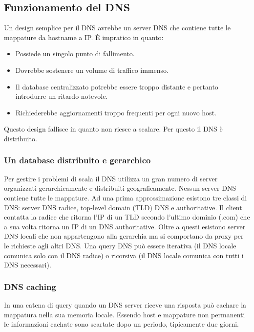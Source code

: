 \subsection{Funzionamento del DNS}
Un design semplice per il DNS avrebbe un server DNS che contiene tutte le mappature da hostname a IP. \`E impratico in quanto:
\begin{itemize}
\item Possiede un singolo punto di fallimento.
\item Dovrebbe sostenere un volume di traffico immenso.
\item Il database centralizzato potrebbe essere troppo distante e pertanto introdurre un ritardo notevole.
\item Richiederebbe aggiornamenti troppo frequenti per ogni nuovo host.
\end{itemize}
Questo design fallisce in quanto non riesce a scalare. Per questo il DNS \`e distribuito.
\subsubsection{Un database distribuito e gerarchico}
Per gestire i problemi di scala il DNS utilizza un gran numero di server organizzati gerarchicamente e distribuiti geograficamente. Nessun server DNS contiene tutte le mappature. Ad una prima 
approssimazione esistono tre classi di DNS: server DNS radice, top-level domain (TLD) DNS e authoritative. Il client contatta la radice che ritorna l'IP di un TLD secondo l'ultimo dominio (.com) che a sua volta
ritorna un IP di un DNS authoritative. Oltre a questi esistono server DNS locali che non appartengono alla gerarchia ma si comportano da proxy per le richieste agli altri DNS. Una query DNS pu\`o essere 
iterativa (il DNS locale comunica solo con il DNS radice) o ricorsiva (il DNS locale comunica con tutti i DNS necessari). 
\subsubsection{DNS caching}
In una catena di query quando un DNS server riceve una risposta pu\`o cachare la mappatura nella sua memoria locale. Essendo host e mappature non permanenti le informazioni cachate sono scartate dopo un
periodo, tipicamente due giorni. 
